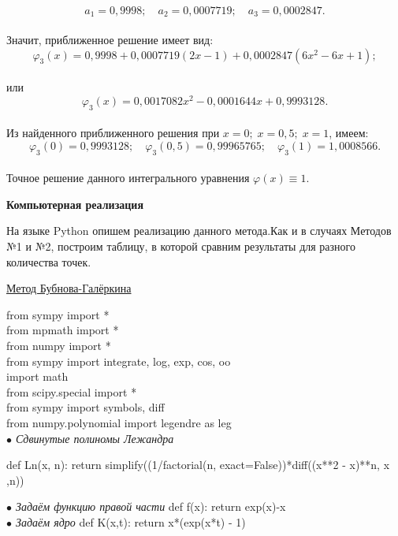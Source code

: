 \documentclass[12pt]{article}
\begin{document}
$$ a_1 = 0,9998; \quad a_2 = 0,0007719; \quad a_3 = 0,0002847 . $$\\
Значит, приближенное решение имеет вид:\\
$$ \varphi_3(x) = 0,9998 + 0,0007719(2x-1) + 0,0002847(6x^2-6x+1); $$\\
или\\
$$ \varphi_3(x) = 0,0017082x^2 - 0,0001644x + 0, 9993128 . $$\\
Из найденного приближенного решения при $ x = 0; \; x = 0,5; \; x =1 $, имеем:\\
$$ \varphi_3(0) = 0,9993128 ; \quad \varphi_3(0,5) = 0,99965765 ; \quad \varphi_3(1) = 1,0008566 . $$\\
Точное решение данного интегрального уравнения $ \varphi(x) \equiv 1 . $ \\
\newpage
\begin{center}
	\textbf{Компьютерная реализация}
\end{center}

На языке Python опишем реализацию данного метода.Как и в случаях Методов №1 и №2, построим таблицу, в которой сравним результаты для разного количества точек.\\

\begin{center}
	\underline{Метод Бубнова-Галёркина}
\end{center}
from sympy import *\\
from mpmath import *\\
from numpy import *\\
from sympy import integrate, log, exp, cos, oo\\
import math\\
from scipy.special import *\\
from sympy import symbols, diff\\
from numpy.polynomial import legendre as leg\\

\textit{$ \bullet $                                     Сдвинутые полиномы Лежандра} \vskip 0.3cm

def Ln(x, n): \vskip 0.3cm
return simplify((1/factorial(n, exact=False))*diff((x**2 - x)**n, x ,n)) \vskip 0.3cm

\textit{$ \bullet $                                          Задаём функцию правой части} \vskip 0.3cm
def f(x): \vskip 0.3cm
return exp(x)-x\\

\textit{$ \bullet $                                                 Задаём ядро} \vskip 0.3cm
def K(x,t): \vskip 0.3cm
return x*(exp(x*t) - 1)\\
\end{document}
